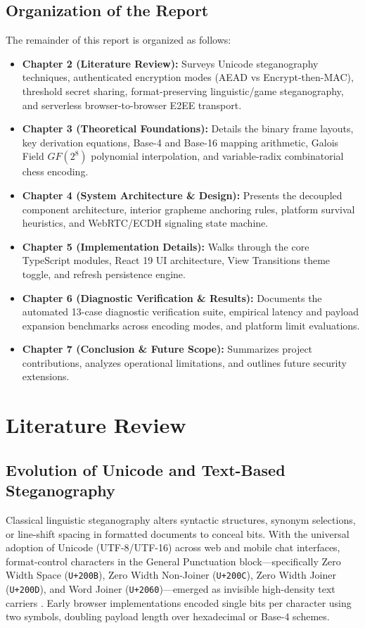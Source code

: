 \documentclass[12pt,a4paper,oneside,openany]{report}
\begin{document}
\section{Organization of the Report}
The remainder of this report is organized as follows:
\begin{itemize}
    \item \textbf{Chapter 2 (Literature Review):} Surveys Unicode steganography techniques, authenticated encryption modes (AEAD vs Encrypt-then-MAC), threshold secret sharing, format-preserving linguistic/game steganography, and serverless browser-to-browser E2EE transport.
    \item \textbf{Chapter 3 (Theoretical Foundations):} Details the binary frame layouts, key derivation equations, Base-4 and Base-16 mapping arithmetic, Galois Field $GF(2^8)$ polynomial interpolation, and variable-radix combinatorial chess encoding.
    \item \textbf{Chapter 4 (System Architecture \& Design):} Presents the decoupled component architecture, interior grapheme anchoring rules, platform survival heuristics, and WebRTC/ECDH signaling state machine.
    \item \textbf{Chapter 5 (Implementation Details):} Walks through the core TypeScript modules, React 19 UI architecture, View Transitions theme toggle, and refresh persistence engine.
    \item \textbf{Chapter 6 (Diagnostic Verification \& Results):} Documents the automated 13-case diagnostic verification suite, empirical latency and payload expansion benchmarks across encoding modes, and platform limit evaluations.
    \item \textbf{Chapter 7 (Conclusion \& Future Scope):} Summarizes project contributions, analyzes operational limitations, and outlines future security extensions.
\end{itemize}

\chapter{Literature Review}

\section{Evolution of Unicode and Text-Based Steganography}
Classical linguistic steganography alters syntactic structures, synonym selections, or line-shift spacing in formatted documents to conceal bits. With the universal adoption of Unicode (UTF-8/UTF-16) across web and mobile chat interfaces, format-control characters in the General Punctuation block---specifically Zero Width Space (\texttt{U+200B}), Zero Width Non-Joiner (\texttt{U+200C}), Zero Width Joiner (\texttt{U+200D}), and Word Joiner (\texttt{U+2060})---emerged as invisible high-density text carriers \cite{unicode_uax29}. Early browser implementations encoded single bits per character using two symbols, doubling payload length over hexadecimal or Base-4 schemes.
\end{document}
